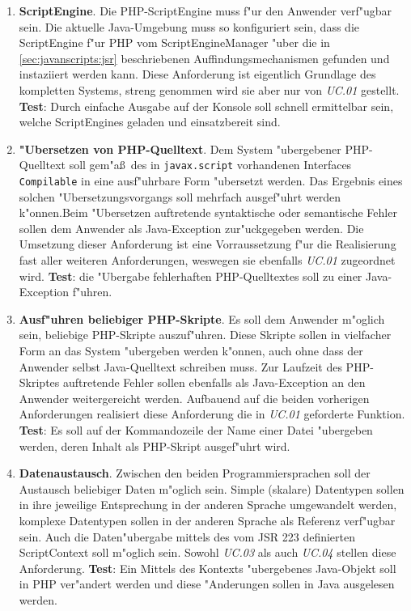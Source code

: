\begin{enumerate}
\item \textbf{ScriptEngine}.
    Die PHP-ScriptEngine muss f"ur den Anwender verf"ugbar sein. Die aktuelle Java-Umgebung muss so konfiguriert sein,
    dass die ScriptEngine f"ur PHP vom ScriptEngineManager "uber die in \ref{sec:javanscripts:jsr} beschriebenen Auffindungsmechanismen
    gefunden und instaziiert werden kann. Diese Anforderung ist eigentlich Grundlage des kompletten Systems, streng genommen wird sie
    aber nur von \emph{UC.01} gestellt.
    \textbf{Test}: Durch einfache Ausgabe auf der Konsole soll schnell ermittelbar sein, welche ScriptEngines geladen und einsatzbereit sind.

\item \textbf{"Ubersetzen von PHP-Quelltext}. Dem System "ubergebener PHP-Quelltext soll gem"a\ss\ des in \texttt{javax.script} vorhandenen 
    Interfaces \texttt{Compilable} in eine ausf"uhrbare Form "ubersetzt werden. Das Ergebnis eines solchen "Ubersetzungsvorgangs
    soll mehrfach ausgef"uhrt werden k"onnen.Beim "Ubersetzen auftretende syntaktische oder semantische Fehler sollen dem Anwender 
    als Java-Exception zur"uckgegeben werden.
    Die Umsetzung dieser Anforderung ist eine Vorraussetzung f"ur die Realisierung fast aller weiteren Anforderungen, 
    weswegen sie ebenfalls \emph{UC.01} zugeordnet wird.
    \textbf{Test}: die "Ubergabe fehlerhaften PHP-Quelltextes soll zu einer Java-Exception f"uhren.

\item \textbf{Ausf"uhren beliebiger PHP-Skripte}. Es soll dem Anwender m"oglich sein, beliebige PHP-Skripte auszuf"uhren. Diese Skripte sollen
    in vielfacher Form an das System "ubergeben werden k"onnen, auch ohne dass der Anwender selbst Java-Quelltext schreiben muss.
    Zur Laufzeit des PHP-Skriptes auftretende Fehler sollen ebenfalls als Java-Exception an den Anwender weitergereicht werden.
    Aufbauend auf die beiden vorherigen Anforderungen realisiert diese Anforderung die in \emph{UC.01} geforderte Funktion.
    \textbf{Test}: Es soll auf der Kommandozeile der Name einer Datei "ubergeben werden, deren Inhalt als PHP-Skript ausgef"uhrt wird.

\item \textbf{Datenaustausch}. Zwischen den beiden Programmiersprachen soll der Austausch beliebiger Daten m"oglich sein. Simple (skalare)
    Datentypen sollen in ihre jeweilige Entsprechung in der anderen Sprache umgewandelt werden, komplexe Datentypen sollen in der anderen 
    Sprache als Referenz verf"ugbar sein. Auch die Daten"ubergabe mittels des vom JSR 223 definierten ScriptContext soll m"oglich sein.
    Sowohl \emph{UC.03} als auch \emph{UC.04} stellen diese Anforderung. 
    \textbf{Test}: Ein Mittels des Kontexts "ubergebenes Java-Objekt soll in PHP ver"andert werden und diese "Anderungen sollen in
    Java ausgelesen werden.


\end{enumerate}
